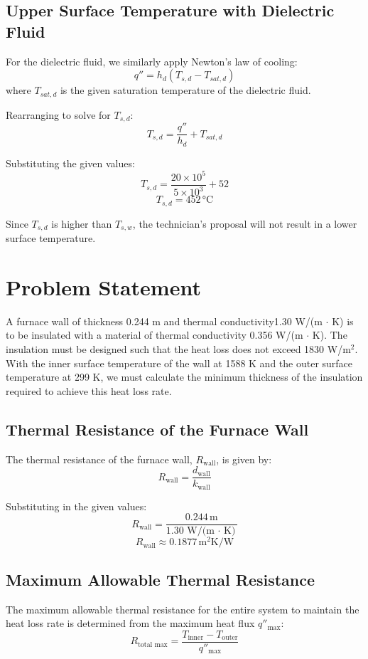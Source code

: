 \documentclass{article}
\begin{document}
\subsection{Upper Surface Temperature with Dielectric Fluid}
For the dielectric fluid, we similarly apply Newton's law of cooling:
\[ q'' = h_d (T_{s,d} - T_{sat,d}) \]
where \( T_{sat,d} \) is the given saturation temperature of the dielectric fluid.

Rearranging to solve for \( T_{s,d} \):
\[ T_{s,d} = \frac{q''}{h_d} + T_{sat,d} \]

Substituting the given values:
\[ T_{s,d} = \frac{20 \times 10^5}{5 \times 10^3} + 52 \]
\[ T_{s,d} = 452 \, \text{°C} \]

Since \( T_{s,d} \) is higher than \( T_{s,w} \), the technician’s proposal will not result in a lower surface temperature.
\newpage
\section{Problem Statement}
A furnace wall of thickness 0.244 m and thermal conductivity1.30 W/(m  \(\cdot\) K) is to be insulated with a material of thermal conductivity 0.356 W/(m \(\cdot\) K). The insulation must be designed such that the heat loss does not exceed 1830 W/m\(^2\). With the inner surface temperature of the wall at 1588 K and the outer surface temperature at 299 K, we must calculate the minimum thickness of the insulation required to achieve this heat loss rate.

\subsection{Thermal Resistance of the Furnace Wall}
The thermal resistance of the furnace wall, \( R_{\text{wall}} \), is given by:
\[ R_{\text{wall}} = \frac{d_{\text{wall}}}{k_{\text{wall}}} \]

Substituting in the given values:
\[ R_{\text{wall}} = \frac{0.244 \, \text{m}}{1.30 \, \text{W/(m \(\cdot\) K)}} \]
\[ R_{\text{wall}} \approx 0.1877 \, \text{m}^2\text{K/W} \]

\subsection{Maximum Allowable Thermal Resistance}
The maximum allowable thermal resistance for the entire system to maintain the heat loss rate is determined from the maximum heat flux \( q''_{\text{max}} \):
\[ R_{\text{total max}} = \frac{T_{\text{inner}} - T_{\text{outer}}}{q''_{\text{max}}} \]
\end{document}
